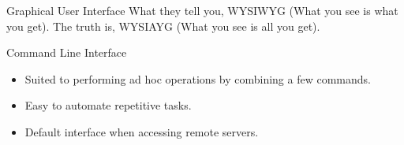 



\begin{frame}
\begin{block}{Graphical User Interface}
What they tell you, WYSIWYG (What you see is what you get). \pause
The truth is, WYSIAYG (What you see is all you get).
\end{block}

\pause

\begin{block}{Command Line Interface}
\begin{itemize}
\item Suited to performing ad hoc operations by combining a few commands.  
\item Easy to automate repetitive tasks.
\item Default interface when accessing remote servers.  
\end{itemize}
\end{block}
\end{frame}

